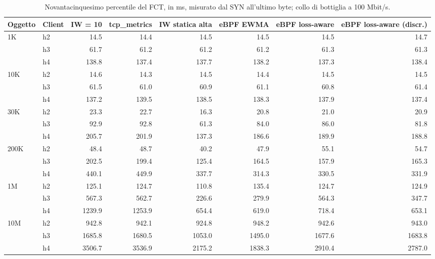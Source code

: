\begin{table}[htbp]
  \centering
  \caption{Novantacinquesimo percentile del FCT, in ms, misurato dal SYN all'ultimo byte; collo di bottiglia a 100 Mbit/s.}
  \label{tab:fct-p95-100}
  \begin{tabular}{llrrrrrr}
    \toprule
    Oggetto & Client & IW = 10 & tcp\_metrics & IW statica alta & eBPF EWMA & eBPF loss-aware & eBPF loss-aware (discr.) \\
    \midrule
    1K & h2 & 14.5 & 14.4 & 14.5 & 14.5 & 14.5 & 14.7 \\
     & h3 & 61.7 & 61.2 & 61.2 & 61.2 & 61.3 & 61.3 \\
     & h4 & 138.8 & 137.4 & 137.7 & 138.2 & 137.3 & 138.4 \\
    \addlinespace
    10K & h2 & 14.6 & 14.3 & 14.5 & 14.4 & 14.5 & 14.5 \\
     & h3 & 61.5 & 61.0 & 60.9 & 61.1 & 60.8 & 61.4 \\
     & h4 & 137.2 & 139.5 & 138.5 & 138.3 & 137.9 & 137.4 \\
    \addlinespace
    30K & h2 & 23.3 & 22.7 & 16.3 & 20.8 & 21.0 & 20.9 \\
     & h3 & 92.9 & 92.8 & 61.3 & 84.0 & 86.0 & 81.8 \\
     & h4 & 205.7 & 201.9 & 137.3 & 186.6 & 189.9 & 188.8 \\
    \addlinespace
    200K & h2 & 48.4 & 48.7 & 40.2 & 47.9 & 55.1 & 54.7 \\
     & h3 & 202.5 & 199.4 & 125.4 & 164.5 & 157.9 & 165.3 \\
     & h4 & 440.1 & 449.9 & 337.7 & 314.3 & 330.5 & 331.9 \\
    \addlinespace
    1M & h2 & 125.1 & 124.7 & 110.8 & 135.4 & 124.7 & 124.9 \\
     & h3 & 567.3 & 562.7 & 226.6 & 279.9 & 564.3 & 347.7 \\
     & h4 & 1239.9 & 1253.9 & 654.4 & 619.0 & 718.4 & 653.1 \\
    \addlinespace
    10M & h2 & 942.8 & 942.1 & 924.8 & 948.2 & 942.6 & 943.0 \\
     & h3 & 1685.8 & 1680.5 & 1053.0 & 1495.0 & 1677.6 & 1683.8 \\
     & h4 & 3506.7 & 3536.9 & 2175.2 & 1838.3 & 2910.4 & 2787.0 \\
    \bottomrule
  \end{tabular}
\end{table}
